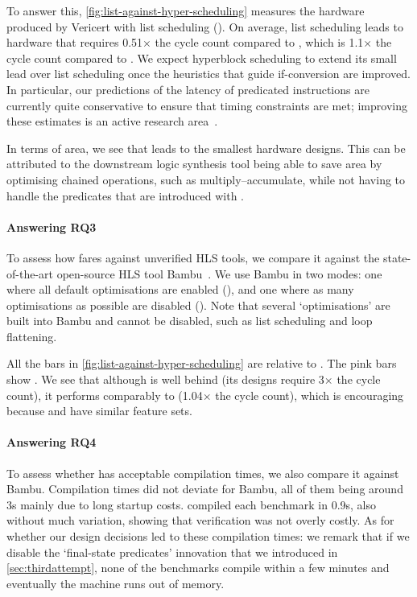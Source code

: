 To answer this, \cref{fig:list-against-hyper-scheduling} measures the hardware produced by Vericert with list scheduling (\VericertList{}). On average, list scheduling leads to hardware that requires 0.51$\times$ the cycle count compared to \VericertBase{}, which is 1.1$\times$ the cycle count compared to \VericertHyper{}. We expect hyperblock scheduling to extend its small lead over list scheduling once the heuristics that guide if-conversion are improved.  In particular, our predictions of the latency of predicated instructions are currently quite conservative to ensure that timing constraints are met; improving these estimates is an active research area~\cite{TanFeb15,RizziJul23,WangOct23,UstunNov20,ZhengFeb14}.

In terms of area, we see that \VericertList{} leads to the smallest hardware designs. This can be attributed to the downstream logic synthesis tool being able to save area by optimising chained operations, such as multiply--accumulate, while not having to handle the predicates that are introduced with \VericertHyper{}.

\paragraph{Answering RQ3}
To assess how \VericertHyper{} fares against unverified HLS tools, we compare it against the state-of-the-art open-source HLS tool Bambu~\cite[]{ferrandi2021bambu}. We use Bambu in two modes: one where all default optimisations are enabled (\BambuDefault{}), and one where as many optimisations as possible are disabled (\BambuNoOpt{}). Note that several `optimisations' are built into Bambu and cannot be disabled, such as list scheduling and loop flattening.

All the bars in \cref{fig:list-against-hyper-scheduling} are relative to \BambuDefault. The pink bars show \BambuNoOpt. We see that although \VericertHyper{} is well behind \BambuDefault{} (its designs require 3$\times$ the cycle count), it performs comparably to \BambuNoOpt{} (1.04$\times$ the cycle count), which is encouraging because \VericertHyper{} and \BambuNoOpt{} have similar feature sets.

\paragraph{Answering RQ4}
To assess whether \VericertHyper{} has acceptable compilation times, we also compare it against Bambu.  Compilation times did not deviate for Bambu, all of them being around 3s mainly due to long startup costs. \VericertHyper{} compiled each benchmark in 0.9s, also without much variation, showing that verification was not overly costly.  As for whether our design decisions led to these compilation times: we remark that if we disable the `final-state predicates' innovation that we introduced in \cref{sec:thirdattempt}, none of the benchmarks compile within a few minutes and eventually the machine runs out of memory.

